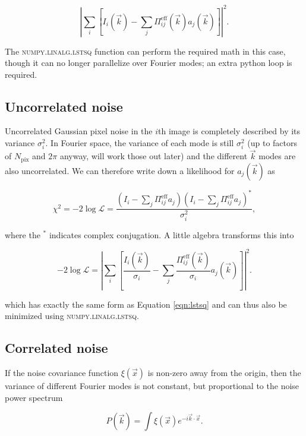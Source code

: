 \documentclass{article}
\begin{document}
\begin{equation}
  \label{eqn:lstsq}
  \left|\sum_i\left[I_i(\vec{k}) - \sum_j \Pi^\mathrm{eff}_{ij}(\vec{k}) a_j(\vec{k})\right]\right|^2.
\end{equation}

The \textsc{numpy.linalg.lstsq} function can perform the required math in this case, though it can
no longer parallelize over Fourier modes; an extra python loop is required.

\subsection{Uncorrelated noise}

Uncorrelated Gaussian pixel noise in the $i$th image is completely described by its variance
$\sigma^2_i$.  In Fourier space, the variance of each mode is still $\sigma^2_i$ (up to factors of
$N_\mathrm{pix}$ and $2 \pi$ anyway, will work those out later) and the different $\vec{k}$ modes
are also uncorrelated.  We can therefore write down a likelihood for $a_j(\vec{k})$ as

\begin{equation}
  \chi^2 = -2 \log \mathcal{L} = \frac{(I_i - \sum_j \Pi^\mathrm{eff}_{ij} a_j)(I_i - \sum_j \Pi^\mathrm{eff}_{ij} a_j)^*}{\sigma_i^2},
\end{equation}

where the $^*$ indicates complex conjugation.  A little algebra transforms this into

\begin{equation}
  \label{eqn:like}
  -2 \log \mathcal{L} = \left|\sum_i\left[\frac{I_i(\vec{k})}{\sigma_i} - \sum_j \frac{\Pi^\mathrm{eff}_{ij}(\vec{k})}{\sigma_i} a_j(\vec{k})\right]\right|^2.
\end{equation}

which has exactly the same form as Equation \ref{eqn:lstsq} and can thus also be minimized using
\textsc{numpy.linalg.lstsq}.

\subsection{Correlated noise}

If the noise covariance function $\xi(\vec{x})$ is non-zero away from the origin, then the variance
of different Fourier modes is not constant, but proportional to the noise power spectrum

\begin{equation}
  P(\vec{k}) = \int \xi(\vec{x}) e^{-i \vec{k}\cdot\vec{x}}.
\end{equation}
\end{document}
